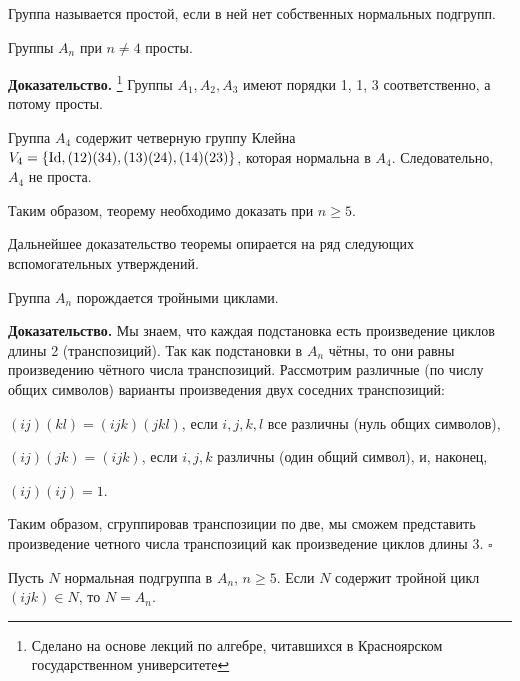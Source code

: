 
Группа называется \textcolor{defcolor}{простой}, если в ней нет собственных нормальных подгрупп.

\begin{theorem}\label{Tm_An_simple}
Группы \(A_{n}\) при \(n \neq 4\) просты.
\end{theorem}
\textbf{Доказательство.}
\footnote{Сделано на основе лекций по алгебре, читавшихся в Красноярском государственном университете}
Группы $A_1, A_2, A_3$ имеют порядки 1, 1, 3 соответственно, а потому просты. 
\medskip


Группа \(A_{4}\) содержит четверную группу Клейна \(V_{4}=\{\mathrm{Id} , (12)(34), (13)(24), (14)(23) \}\), которая нормальна в $A_4$. Следовательно, $A_4$ не проста.
\medskip

Таким образом, теорему необходимо доказать при $n\geqslant5$.
\medskip

Дальнейшее доказательство теоремы опирается на ряд следующих вспомогательных утверждений.

\begin{theorem}\label{Tm_An_Generation}
Группа \(A_n\) порождается тройными циклами.
\end{theorem}

\textbf{Доказательство.}
%
Мы знаем, что каждая подстановка есть произведение циклов длины 2
(транспозиций). Так как подстановки в \(A_{n}\) чётны, то они равны
произведению чётного числа транспозиций. Рассмотрим различные (по числу общих символов) варианты произведения двух
соседних транспозиций:

\( (ij)(kl) = (ijk)(jkl)\),
если \(i,j,k,l\) все различны (нуль общих символов),

\(\left( ij \right)\left( jk \right) = \left( {{ijk}} \right)\),
если \(i,j,k\) различны (один общий символ), и, наконец,

\(\left( {{ij}} \right)\left( {{ij}} \right) = 1\).
\medskip

Таким образом, сгруппировав транспозиции по две, мы сможем представить произведение четного числа транспозиций как произведение циклов
длины 3. $\square$

\begin{lemma}\label{Lm_If_triple}
Пусть $N$ нормальная подгруппа в \(A_{n}\), $n\geqslant 5$. Если \(N\) содержит тройной цикл \( (ijk) \in N\), то \(N = A_{n}\).
\end{lemma}

